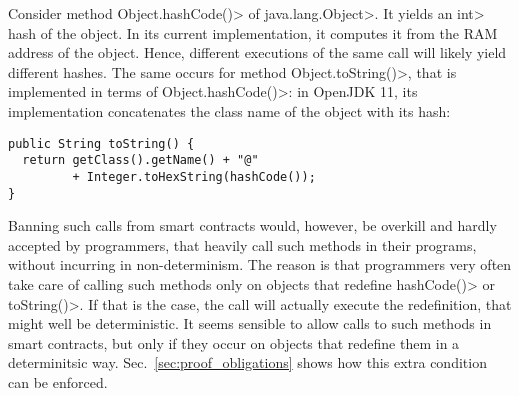 Consider method \<Object.hashCode()> of \<java.lang.Object>. It yields an \<int>
hash of the object. In its current implementation, it computes it from the
RAM address of the object. Hence, different executions of the same call
will likely yield different hashes. The same occurs for method \<Object.toString()>,
that is implemented in terms of \<Object.hashCode()>: in OpenJDK 11, its
implementation concatenates the class name of the object with its hash:
%
\begin{verbatim}
public String toString() {
  return getClass().getName() + "@"
         + Integer.toHexString(hashCode());
}
\end{verbatim}
%
Banning such calls from smart contracts would, however, be overkill
and hardly accepted by programmers, that
heavily call such methods in their programs, without incurring in
non-determinism. The reason is that programmers very often
take care of calling such methods only on objects that redefine
\<hashCode()> or \<toString()>. If that is the case, the call will actually
execute the redefinition, that might well be deterministic. It seems sensible
to allow calls to such methods in smart contracts, but only if they occur
on objects that redefine them in a determinitsic way. Sec.~\ref{sec:proof_obligations}
shows how this extra condition can be enforced.
